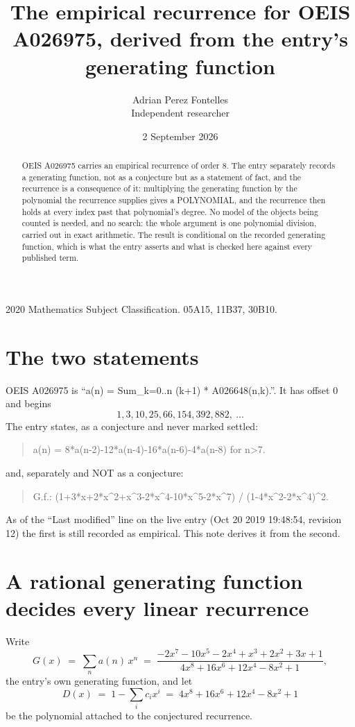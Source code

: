 \documentclass[11pt,a4paper]{article}
\title{The empirical recurrence for OEIS A026975, derived from the entry's generating function}
\author{Adrian Perez Fontelles\\ \small Independent researcher}
\date{2 September 2026}
\theoremstyle{plain}
\theoremstyle{definition}
\begin{document}
\maketitle

\begin{abstract}
OEIS A026975 carries an empirical recurrence of order $8$. The entry separately records a
generating function, not as a conjecture but as a statement of fact, and the recurrence is a
consequence of it: multiplying the generating function by the polynomial the recurrence
supplies gives a POLYNOMIAL, and the recurrence then holds at every index past that
polynomial's degree. No model of the objects being counted is needed, and no search: the
whole argument is one polynomial division, carried out in exact arithmetic. The result is
conditional on the recorded generating function, which is what the entry asserts and what is
checked here against every published term.
\end{abstract}

\noindent\small 2020 Mathematics Subject Classification. 05A15, 11B37, 30B10.\normalsize

\section{The two statements}

OEIS A026975 is ``a(n) = Sum\_{k=0..n} (k+1) * A026648(n,k).''. It has offset $0$ and begins
\[
1, 3, 10, 25, 66, 154, 392, 882,\ \dots
\]
The entry states, as a conjecture and never marked settled:
\begin{quote}
a(n) = 8*a(n-2)-12*a(n-4)-16*a(n-6)-4*a(n-8) for n>7.
\end{quote}
and, separately and NOT as a conjecture:
\begin{quote}
G.f.: (1+3*x+2*x\^{}2+x\^{}3-2*x\^{}4-10*x\^{}5-2*x\^{}7) / (1-4*x\^{}2-2*x\^{}4)\^{}2.
\end{quote}
As of the ``Last modified'' line on the live entry (Oct 20 2019 19:48:54, revision 12) the first is still
recorded as empirical. This note derives it from the second.

\section{A rational generating function decides every linear recurrence}

Write
\[
G(x)\;=\;\sum_{n}a(n)\,x^{n}\;=\;\frac{- 2 x^{7} - 10 x^{5} - 2 x^{4} + x^{3} + 2 x^{2} + 3 x + 1}{4 x^{8} + 16 x^{6} + 12 x^{4} - 8 x^{2} + 1},
\]
the entry's own generating function, and let
\[
D(x)\;=\;1-\sum_i c_i x^{i}\;=\;4 x^{8} + 16 x^{6} + 12 x^{4} - 8 x^{2} + 1
\]
be the polynomial attached to the conjectured recurrence.
\end{document}
